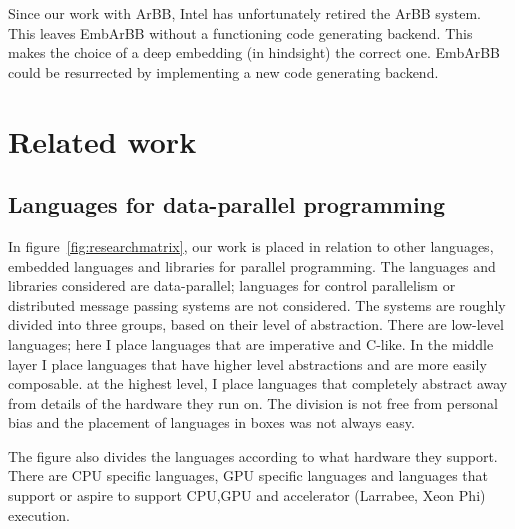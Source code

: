 \documentclass[a4paper]{book}
\begin{document}
Since our work with ArBB, Intel has unfortunately retired the ArBB system. This 
leaves EmbArBB without a functioning code generating backend. This makes the choice of a
deep embedding (in hindsight) the correct one. EmbArBB could be resurrected by implementing 
a new code generating backend. 


%
%
\section{Related work} 
\label{sec:relatedwork}
\FloatBarrier


\subsection{Languages for data-parallel programming}

In figure~\ref{fig:researchmatrix}, our work is placed in relation to other languages,
embedded languages and libraries for parallel programming. The languages and libraries considered 
are data-parallel; languages for control parallelism or distributed message passing systems are 
not considered. The systems are roughly divided 
into three groups, based on their level of abstraction. There are low-level languages; here 
I place languages that are imperative and C-like. In the middle layer I place languages 
that have higher level abstractions and are more easily composable. 
at the highest level, I place languages that completely abstract away from details of the 
hardware they run on. The division is not free from personal bias and the placement of languages
in boxes was not always easy. 

The figure also divides the languages according to what hardware they support. There 
are CPU specific languages, GPU specific languages and languages that support or aspire 
to support CPU,GPU and accelerator (Larrabee, Xeon Phi) execution. 
\end{document}
